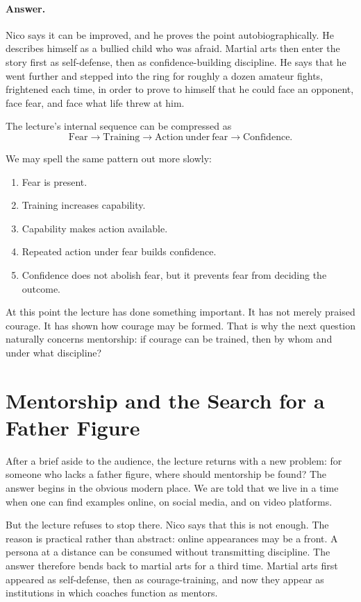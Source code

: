 \paragraph{Answer.} Nico says it can be improved, and he proves the point autobiographically. He describes himself as a bullied child who was afraid. Martial arts then enter the story first as self-defense, then as confidence-building discipline. He says that he went further and stepped into the ring for roughly a dozen amateur fights, frightened each time, in order to prove to himself that he could face an opponent, face fear, and face what life threw at him.

The lecture's internal sequence can be compressed as
\begin{equation}
\mathrm{Fear}\to \mathrm{Training}\to \mathrm{Action\ under\ fear}\to \mathrm{Confidence}.
\end{equation}

We may spell the same pattern out more slowly:
\begin{enumerate}
\item Fear is present.
\item Training increases capability.
\item Capability makes action available.
\item Repeated action under fear builds confidence.
\item Confidence does not abolish fear, but it prevents fear from deciding the outcome.
\end{enumerate}

At this point the lecture has done something important. It has not merely praised courage. It has shown how courage may be formed. That is why the next question naturally concerns mentorship: if courage can be trained, then by whom and under what discipline?

\section{Mentorship and the Search for a Father Figure}

After a brief aside to the audience, the lecture returns with a new problem: for someone who lacks a father figure, where should mentorship be found? The answer begins in the obvious modern place. We are told that we live in a time when one can find examples online, on social media, and on video platforms.

But the lecture refuses to stop there. Nico says that this is not enough. The reason is practical rather than abstract: online appearances may be a front. A persona at a distance can be consumed without transmitting discipline. The answer therefore bends back to martial arts for a third time. Martial arts first appeared as self-defense, then as courage-training, and now they appear as institutions in which coaches function as mentors.

